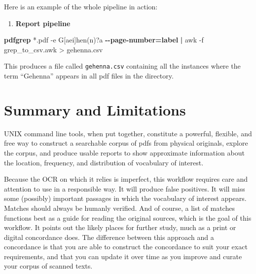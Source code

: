 \documentclass[
  letterpaper,
]{tufte-handout}
\newenvironment{Shaded}{\begin{snugshade}}{\end{snugshade}}
\newcommand{\AttributeTok}[1]{\textcolor[rgb]{0.00,0.34,0.68}{#1}}
\newcommand{\ExtensionTok}[1]{\textcolor[rgb]{0.00,0.58,1.00}{\textbf{#1}}}
\newcommand{\FunctionTok}[1]{\textcolor[rgb]{0.39,0.29,0.61}{#1}}
\newcommand{\KeywordTok}[1]{\textcolor[rgb]{0.12,0.11,0.11}{\textbf{#1}}}
\newcommand{\NormalTok}[1]{\textcolor[rgb]{0.12,0.11,0.11}{#1}}
\newcommand{\OperatorTok}[1]{\textcolor[rgb]{0.12,0.11,0.11}{#1}}
\newcommand{\PreprocessorTok}[1]{\textcolor[rgb]{0.00,0.43,0.16}{#1}}
\newcommand{\StringTok}[1]{\textcolor[rgb]{0.75,0.01,0.01}{#1}}
\providecommand{\tightlist}{%
  \setlength{\itemsep}{0pt}\setlength{\parskip}{0pt}}
\begin{document}
Here is an example of the whole pipeline in action:

\begin{enumerate}
\def\labelenumi{(\arabic{enumi})}
\setcounter{enumi}{9}
\tightlist
\item
  \textbf{Report pipeline}
\end{enumerate}

\begin{Shaded}
\begin{Highlighting}[]
 \ExtensionTok{pdfgrep} \PreprocessorTok{*}\NormalTok{.pdf }\AttributeTok{{-}e} \StringTok{\textquotesingle{}G[aei]hen(n)?a\textquotesingle{}}
  \ExtensionTok{{-}{-}page{-}number=label}  \KeywordTok{|} \FunctionTok{awk} \AttributeTok{{-}f}\NormalTok{ grep\_to\_csv.awk }\OperatorTok{\textgreater{}}\NormalTok{ gehenna.csv}
\end{Highlighting}
\end{Shaded}

This produces a file called \texttt{gehenna.csv} containing all the
instances where the term ``Gehenna'' appears in all pdf files in the
directory.

\section{Summary and Limitations}\label{summary-and-limitations}

UNIX command line tools, when put together, constitute a powerful,
flexible, and free way to construct a searchable corpus of pdfs from
physical originals, explore the corpus, and produce usable reports to
show approximate information about the location, frequency, and
distribution of vocabulary of interest.

Because the OCR on which it relies is imperfect, this workflow requires
care and attention to use in a responsible way. It will produce false
positives. It will miss some (possibly) important passages in which the
vocabulary of interest appears. Matches should always be humanly
verified. And of course, a list of matches functions best as a guide for
reading the original sources, which is the goal of this workflow. It
points out the likely places for further study, much as a print or
digital concordance does. The difference between this approach and a
concordance is that you are able to construct the concordance to suit
your exact requirements, and that you can update it over time as you
improve and curate your corpus of scanned texts.

\clearpage
\end{document}
